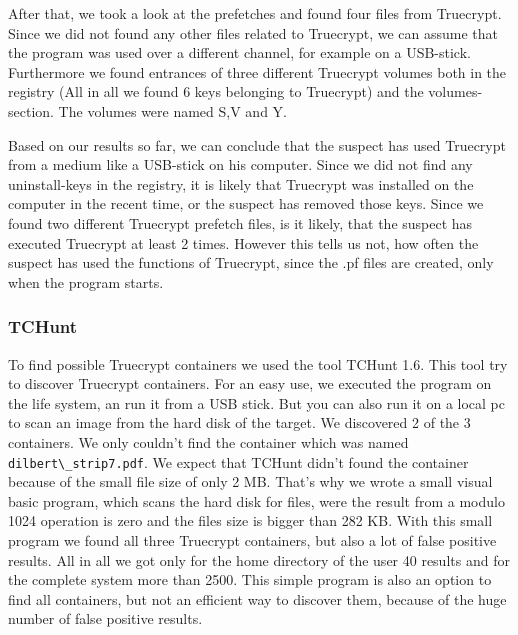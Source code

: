 After that, we took a look at the prefetches and found four files from Truecrypt. Since we did not found any other files related to Truecrypt, we can assume that the program was used over a different channel, for example on a USB-stick. Furthermore we found entrances of three different Truecrypt volumes both in the registry (All in all we found 6 keys belonging to Truecrypt) and the volumes-section. The volumes were named S,V and Y.

Based on our results so far, we can conclude that the suspect has used Truecrypt from a medium like a USB-stick on his computer. Since we did not find any uninstall-keys in the registry, it is likely that Truecrypt was installed on the computer in the recent time, or the suspect has removed those keys. Since we found two different Truecrypt prefetch files, is it likely, that the suspect has executed Truecrypt at least 2 times. However this tells us not, how often the suspect has used the functions of Truecrypt, since the .pf files are created, only when the program starts.

\subsubsection{TCHunt}
To find possible Truecrypt containers we used the tool TCHunt 1.6. This tool try to discover Truecrypt containers. For an easy use, we executed the program on the life system, an run it from a USB stick. But you can also run it on a local pc to scan an image from the hard disk of the target. We discovered 2 of the 3 containers. We only couldn't find the container which was named \verb+dilbert\_strip7.pdf+. We expect that TCHunt didn't found the container because of the small file size of only 2 MB. That's why we wrote a small visual basic program, which scans the hard disk for files, were the result from a modulo 1024 operation is zero and the files size is bigger than 282 KB. With this small program we found all three Truecrypt containers, but also a lot of false positive results. All in all we got only for the home directory of the user 40 results and for the complete system more than 2500. This simple program is also an option to find all containers, but not an efficient way to discover them, because of the huge number of false positive results.  
\\
